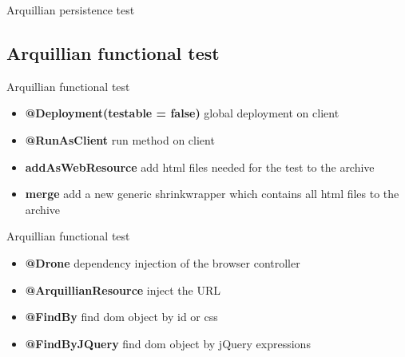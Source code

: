 \begin{frame}{Arquillian persistence test}
  

\end{frame}

\subsection[Functional test]{Arquillian functional test}
\begin{frame}{Arquillian functional test}
  
  \begin{itemize}
  	\item {\textbf{@Deployment(testable = false)}} global deployment on client
  	\item {\textbf{@RunAsClient}} run method on client
  	\item {\textbf{addAsWebResource}} add html files needed for the test to the archive
  	\item {\textbf{merge}} add a new generic shrinkwrapper which contains all html files to the archive
  \end{itemize}
  
\end{frame}

\begin{frame}{Arquillian functional test}
  
 \begin{itemize}
 	\item {\textbf{@Drone}} dependency injection of the browser controller
 	\item {\textbf{@ArquillianResource}} inject the URL 
 	\item {\textbf{@FindBy}} find dom object by id or css
 	\item {\textbf{@FindByJQuery}} find dom object by jQuery expressions
 \end{itemize}
\end{frame}

